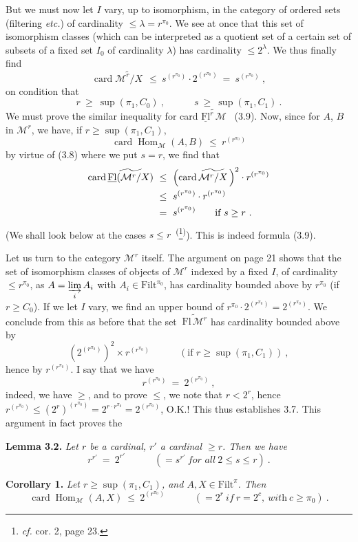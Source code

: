 \documentclass[11pt]{article}
\newcommand{\printedpage}[1]{\marginpar{\footnotesize p.~#1}}
\newcommand{\msp}[1]{\marginpar{\footnotesize [#1]}}
\newcommand{\M}{\mathcal{M}}
\newcommand{\Filt}{\mathrm{Filt}}
\newcommand{\Fl}{\mathrm{Fl}}
\newcommand{\uFl}{\underline{\mathrm{Fl}}}
\newcommand{\card}{\operatorname{card}}
\newcommand{\Hom}{\operatorname{Hom}}
\newcommand{\wavy}[1]{\widetilde{#1}}
\begin{document}
But we must now let $I$ vary, up to isomorphism, in the category of ordered sets (filtering \textit{etc.}) of cardinality $\leq\lambda=r^{\pi_0}$. We see at once that this set of isomorphism classes (which can be interpreted as a quotient set of a certain set of subsets of a fixed set $I_0$ of cardinality $\lambda$) has cardinality $\leq 2^\lambda$. We thus finally find
\[
\card\wavy{\M^r/X}\ \ \leq\ s^{(r^{\pi_0})}\cdot 2^{(r^{\pi_0})}\ =\ s^{(r^{\pi_0})}\ ,
\]
on condition that
\[
r\ \geq\ \sup(\pi_1,C_0)\ ,\qquad\quad s\ \geq\ \sup(\pi_1,C_1)\ .
\]
We must prove the similar inequality for card $\wavy{\uFl^r\,\M}$ \ (3.9). Now, since for $A$, $B$ in $\M^r$, we have, if $r\geq\sup(\pi_1,C_1)$,
\[
\card\Hom_{\M}(A,B)\ \leq\ r^{(r^{\pi_0})}
\]
by virtue of (3.8) where we put $s=r$, we find that
\[
\begin{aligned}
\card\wavy{\uFl(\M^r/X)}\ &\leq\ \Bigl(\card\wavy{\M^r/X}\,\Bigr)^2\cdot r^{(r^{\pi_0})}\\
&\leq\ s^{(r^{\pi_0})}\cdot r^{(r^{\pi_0})}\\
&=\ s^{(r^{\pi_0})}\qquad\text{if } s\geq r\ .
\end{aligned}
\]
(We shall look below at the cases $s\leq r$~\textsuperscript{(}\footnote[8]{\textit{cf.} cor. 2, page 23.}\textsuperscript{)}). This is indeed formula (3.9).

\printedpage{16}
\msp{page 23}
Let us turn to the category $\M^r$ itself. The argument on page 21 shows that the set of isomorphism classes of objects of $\M^r$ indexed by a fixed $I$, of cardinality $\leq r^{\pi_0}$, as $A=\varinjlim\limits_i A_i$ with $A_i\in\Filt^{\pi_0}$, has cardinality bounded above by $r^{\pi_0}$ (if $r\geq C_0$). If we let $I$ vary, we find an upper bound of $r^{\pi_0}\cdot 2^{(r^{\pi_0})}=2^{(r^{\pi_0})}$. We conclude from this as before that the set $\ \wavy{\Fl\,\M^r}$ has cardinality bounded above by
\[
(2^{(r^{\pi_0})})^2\times r^{(r^{\pi_0})}\qquad\quad(\text{if } r\geq\sup(\pi_1,C_1))\ ,
\]
hence by $r^{(r^{\pi_0})}$. I say that we have
\[
r^{(r^{\pi_0})}\ =\ 2^{(r^{\pi_0})}\ ,
\]
indeed, we have $\geq$, and to prove $\leq$, we note that $r<2^r$, hence $r^{(r^{\pi_0})}\leq(2^r)^{(r^{\pi_0})}=2^{r\cdot r^{\pi_0}}=2^{(r^{\pi_0})}$, O.K.! This thus establishes 3.7. This argument in fact proves the

\textbf{Lemma 3.2.} \textit{Let $r$ be a cardinal, $r'$ a cardinal $\geq r$. Then we have}
\[
r^{r'}\ =\ 2^{r'}\qquad\quad(=s^{r'}\ \textit{for all}\ 2\leq s\leq r)\ .
\]

\textbf{Corollary 1.} \textit{Let $r\geq\sup(\pi_1,C_1)$, and $A,X\in\Filt^\pi$. Then}
\[
\card\Hom_{\M}(A,X)\ \leq\ 2^{(r^{\pi_0})}\qquad\quad(=2^r\ \textit{if}\ r=2^c,\ \textit{with}\ c\geq\pi_0)\ . \tag*{(3.10)}
\]
\end{document}

